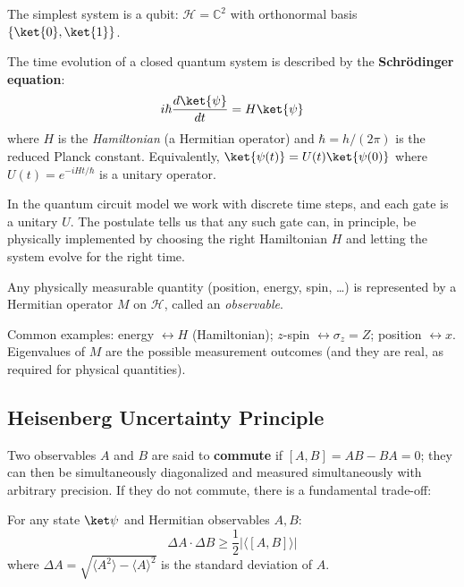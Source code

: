 \documentclass[oneside]{academica}
\begin{document}
The simplest system is a qubit: $\mathcal{H}=\mathbb{C}^2$ with orthonormal basis $\{\ket{0},\ket{1}\}$.

\begin{postulate}
  The time evolution of a closed quantum system is described by the \textbf{Schr\"{o}dinger equation}:
  \begin{equation*}
    i\hbar\frac{d\ket{\psi}}{dt}=H\ket{\psi}
  \end{equation*}
  where $H$ is the \emph{Hamiltonian} (a Hermitian operator) and $\hbar=h/(2\pi)$ is the reduced Planck constant.
  Equivalently, $\ket{\psi(t)}=U(t)\ket{\psi(0)}$ where $U(t)=e^{-iHt/\hbar}$ is a unitary operator.
\end{postulate}

In the quantum circuit model we work with discrete time steps, and each gate is a unitary $U$.
The postulate tells us that any such gate can, in principle, be physically implemented by choosing the right Hamiltonian $H$ and letting the system evolve for the right time.

\begin{postulate}[Observables]
  Any physically measurable quantity (position, energy, spin, \ldots) is represented by a Hermitian operator $M$ on $\mathcal{H}$, called an \emph{observable}.
\end{postulate}

Common examples: energy $\leftrightarrow H$ (Hamiltonian); $z$-spin $\leftrightarrow\sigma_z=Z$; position $\leftrightarrow\hat x$.
Eigenvalues of $M$ are the possible measurement outcomes (and they are real, as required for physical quantities).

\subsection{Heisenberg Uncertainty Principle}

Two observables $A$ and $B$ are said to \textbf{commute} if $[A,B]=AB-BA=0$; they can then be simultaneously diagonalized and measured simultaneously with arbitrary precision.
If they do not commute, there is a fundamental trade-off:

\begin{theorem*}
  For any state $\ket\psi$ and Hermitian observables $A,B$:
  \begin{equation*}
    \Delta A \cdot \Delta B \ge \frac{1}{2}\bigl|\langle[A,B]\rangle\bigr|
  \end{equation*}
  where $\Delta A=\sqrt{\langle A^2\rangle-\langle A\rangle^2}$ is the standard deviation of $A$.
\end{theorem*}
\end{document}
